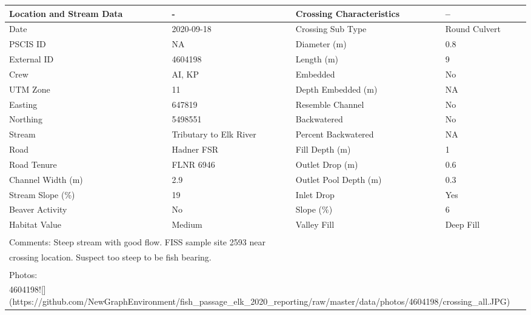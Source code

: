 \documentclass[
]{book}
\begin{document}
\begin{tabular}{l|l|l|l}
\hline
Location and Stream Data & - & Crossing Characteristics & --\\
\hline
Date & 2020-09-18 & Crossing Sub Type & Round Culvert\\
\hline
PSCIS ID & NA & Diameter (m) & 0.8\\
\hline
External ID & 4604198 & Length (m) & 9\\
\hline
Crew & AI, KP & Embedded & No\\
\hline
UTM Zone & 11 & Depth Embedded (m) & NA\\
\hline
Easting & 647819 & Resemble Channel & No\\
\hline
Northing & 5498551 & Backwatered & No\\
\hline
Stream & Tributary to Elk River & Percent Backwatered & NA\\
\hline
Road & Hadner FSR & Fill Depth (m) & 1\\
\hline
Road Tenure & FLNR 6946 & Outlet Drop (m) & 0.6\\
\hline
Channel Width (m) & 2.9 & Outlet Pool Depth (m) & 0.3\\
\hline
Stream Slope (\%) & 19 & Inlet Drop & Yes\\
\hline
Beaver Activity & No & Slope (\%) & 6\\
\hline
Habitat Value & Medium & Valley Fill & Deep Fill\\
\hline
\multicolumn{4}{l}{\textsuperscript{} Comments: Steep stream with good flow. FISS sample site 2593 near}\\
\multicolumn{4}{l}{crossing location. Suspect too steep to be fish bearing.}\\
\multicolumn{4}{l}{\textsuperscript{} Photos:}\\
\multicolumn{4}{l}{4604198![](https://github.com/NewGraphEnvironment/fish\_passage\_elk\_2020\_reporting/raw/master/data/photos/4604198/crossing\_all.JPG)}\\
\end{tabular}
\end{document}
